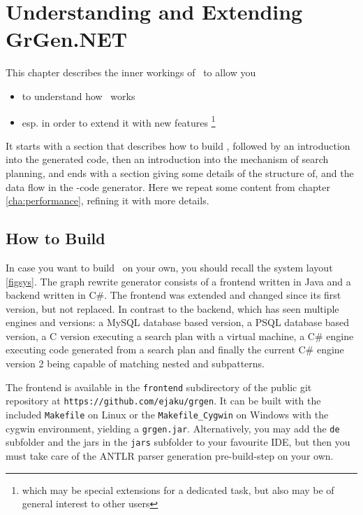 \chapter{Understanding and Extending GrGen.NET} \label{cha:developing}

This chapter describes the inner workings of \GrG~to allow you
\begin{itemize}
\item to understand how \GrG~works
\item esp. in order to extend it with new features
\footnote{which may be special extensions for a dedicated task, but also may be of general interest to other users}
\end{itemize}
It starts with a section that describes how to build \GrG, followed by an introduction into the generated code, then an introduction into the mechanism of search planning, and ends with a section giving some details of the structure of, and the data flow in the \GrG-code generator.
Here we repeat some content from chapter \ref{cha:performance}, refining it with more details.

\section{How to Build}\label{sub:building}

In case you want to build \GrG~on your own, you should recall the system layout \ref{figsys}. 
The graph rewrite generator consists of a frontend written in Java and a backend written in C\#.
The frontend was extended and changed since its first version, but not replaced.
In contrast to the backend, which has seen multiple engines and versions: a MySQL database based version, a PSQL database based version, 
a C version executing a search plan with a virtual machine, a C\# engine executing code generated from a search plan and finally the current C\# engine version 2 being capable of matching nested and subpatterns.

The frontend is available in the \texttt{frontend} subdirectory of the public git repository at \texttt{https://github.com/ejaku/grgen}.
It can be built with the included \texttt{Makefile} on Linux or the \texttt{Makefile\_Cygwin} on Windows with the cygwin environment, yielding a \texttt{grgen.jar}. 
Alternatively, you may add the \texttt{de} subfolder and the jars in the \texttt{jars} subfolder to your favourite IDE, but then you must take care of the ANTLR parser generation pre-build-step on your own. 

